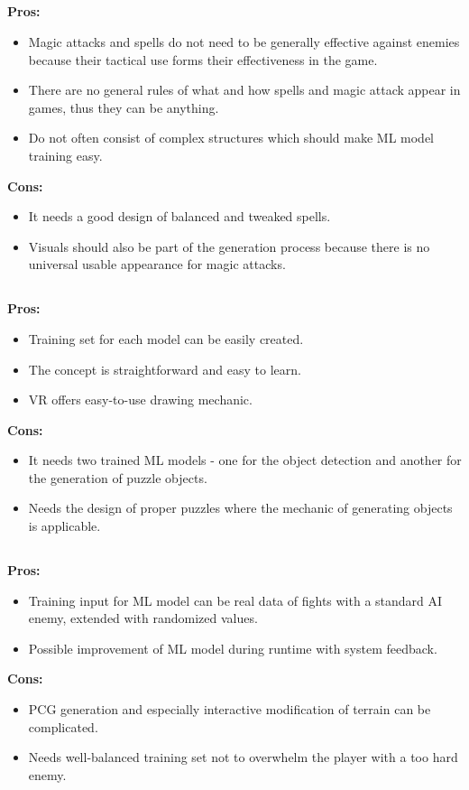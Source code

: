 \documentclass[MGS,Master,english]{twbook}%
\begin{document}
\subsection{}
\textbf{Pros:}
\begin{itemize}
	\item Magic attacks and spells do not need to be generally effective against enemies because their tactical use forms their effectiveness in the game.
	\item There are no general rules of what and how spells and magic attack appear in games, thus they can be anything.
	\item Do not often consist of complex structures  which should make ML model training easy.
\end{itemize}
\textbf{Cons:}
\begin{itemize}
	\item It needs a good design of balanced and tweaked spells.
	\item Visuals should also be part of the generation process because there is no universal usable appearance for magic attacks.
\end{itemize}

\subsection{}
\textbf{Pros:}
\begin{itemize}
	\item Training set for each model can be easily created.
	\item The concept is straightforward and easy to learn.
	\item \ac{VR} offers easy-to-use drawing mechanic.
\end{itemize}
\textbf{Cons:}
\begin{itemize}
	\item It needs two trained ML models - one for the object detection and another for the generation of puzzle objects. 
	\item Needs the design of proper puzzles where the mechanic of generating objects is applicable.
\end{itemize}

\subsection{}
\textbf{Pros:}
\begin{itemize}
	\item Training input for ML model can be real data of fights with a standard AI enemy, extended with randomized values.
	\item Possible improvement of ML model during runtime with system feedback.
\end{itemize}
\textbf{Cons:}
\begin{itemize}
	\item PCG generation and especially interactive modification of terrain can be complicated.
	\item Needs well-balanced training set not to overwhelm the player with a too hard enemy.
\end{itemize}
\end{document}
